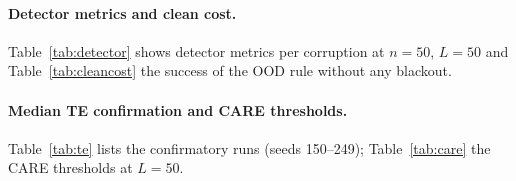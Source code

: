 \documentclass[11pt]{article}
\newcommand{\fixed}{\textsf{fixed}\xspace}
\newcommand{\ood}{\textsf{ood}\xspace}
\begin{document}
\paragraph{Detector metrics and clean cost.} Table~\ref{tab:detector} shows detector metrics per corruption at $n{=}50$, $L{=}50$ and Table~\ref{tab:cleancost} the success of the OOD rule without any blackout.
\begin{table}[h]
\centering\small
\resizebox{\textwidth}{!}{}
\caption{OOD detector at $n{=}50$, $L{=}50$ (90 seeds).}
\label{tab:detector}
\end{table}
\begin{table}[h]
\centering\small

\caption{Clean cost of the OOD rule, $L{=}0$, 90 seeds, TC. $\Delta$: success of \ood minus \fixed. False-alarm rate is the share of steps flagged.}
\label{tab:cleancost}
\end{table}

\paragraph{Median TE confirmation and CARE thresholds.} Table~\ref{tab:te} lists the confirmatory runs (seeds 150--249); Table~\ref{tab:care} the CARE thresholds at $L{=}50$.
\begin{table}[h]
\centering\small

\caption{Median TE confirmation on 100 new seeds. ``TE/other'': seeds where only Median TE ($h{=}1$) / only the other rule succeeds. $p$ is uncorrected.}
\label{tab:te}
\end{table}
\begin{table}[h]
\centering\small

\caption{CARE-style trigger at three thresholds, TC, 100 seeds, successes at $L{=}50$ and retention against each rule's own clean rate.}
\label{tab:care}
\end{table}
\end{document}
